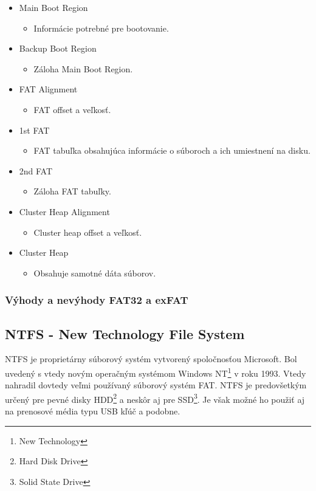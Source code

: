 \documentclass[12pt,oneside,slovak,a4paper]{article}
\begin{document}
\begin{spacing}{1.0}
\begin{itemize}
	\item Main Boot Region
		\begin{itemize}
			\item Informácie potrebné pre bootovanie.
		\end{itemize}
	\item Backup Boot Region
		\begin{itemize}
			\item Záloha Main Boot Region.
		\end{itemize}
	\item FAT Alignment
		\begin{itemize}
			\item FAT offset a veľkosť.
		\end{itemize}
	\item 1st FAT
		\begin{itemize}
			\item FAT tabuľka obsahujúca informácie o súboroch a ich umiestnení na disku.
		\end{itemize}
	\item 2nd FAT
		\begin{itemize}
			\item Záloha FAT tabuľky.
		\end{itemize}
	\item Cluster Heap Alignment
		\begin{itemize}
			\item Cluster heap offset a veľkosť.
		\end{itemize}
	\item Cluster Heap
		\begin{itemize}
			\item Obsahuje samotné dáta súborov.
		\end{itemize}
\end{itemize}
\end{spacing}

\subsubsection{Výhody a nevýhody FAT32 a exFAT}



\subsection{NTFS - New Technology File System}
NTFS je proprietárny súborový systém vytvorený spoločnosťou Microsoft. Bol uvedený s vtedy novým operačným systémom Windows NT\footnote{New Technology} v roku 1993. Vtedy nahradil dovtedy veľmi používaný súborový systém FAT. NTFS je predovšetkým určený pre pevné disky HDD\footnote{Hard Disk Drive} a neskôr aj pre SSD\footnote{Solid State Drive}. Je však možné ho použiť aj na prenosové média typu USB kľúč a podobne. 
\end{document}
